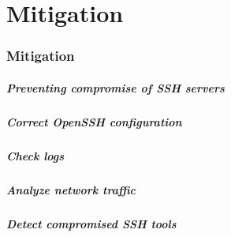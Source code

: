 \part{Mitigation}
\section{Mitigation}

\begin{frame}
	\partpage
\end{frame}

\begin{frame}
	\frametitle{Preventing compromise of SSH servers}
\end{frame}

\begin{frame}
	\frametitle{Correct OpenSSH configuration}
\end{frame}

\begin{frame}
	\frametitle{Check logs}
\end{frame}

\begin{frame}
	\frametitle{Analyze network traffic}
\end{frame}

\begin{frame}
	\frametitle{Detect compromised SSH tools}
\end{frame}
